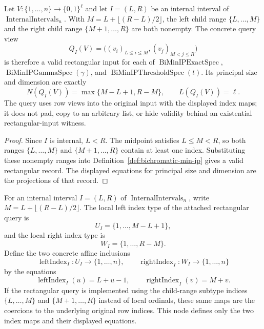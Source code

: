 \begin{lemma}
  \label{lem:minip-split-query-view-valid}
  Let $V:\{1,\ldots,n\}\to\{0,1\}^{\ell}$ and let
  $I=(L,R)$ be an internal interval of
  $\operatorname{InternalIntervals}_n$.  With
  $M=L+\lfloor(R-L)/2\rfloor$, the left child range
  $\{L,\ldots,M\}$ and the right child range $\{M+1,\ldots,R\}$ are both
  nonempty.  The concrete query view
  \[
    Q_I(V)=
      \bigl((v_i)_{L\leq i\leq M},(v_j)_{M<j\leq R}\bigr)
  \]
  is therefore a valid rectangular input for each of
  $\operatorname{BiMinIPExactSpec}$,
  $\operatorname{BiMinIPGammaSpec}(\gamma)$, and
  $\operatorname{BiMinIPThresholdSpec}(t)$.  Its principal size and dimension
  are exactly
  \[
    N(Q_I(V))=\max\{M-L+1,R-M\},\qquad L(Q_I(V))=\ell.
  \]
  The query uses row views into the original input with the displayed index
  maps; it does not pad, copy to an arbitrary list, or hide validity behind an
  existential rectangular-input witness.
\end{lemma}
\begin{proof}
  Since $I$ is internal, $L<R$.  The midpoint satisfies $L\leq M<R$, so both
  ranges $\{L,\ldots,M\}$ and $\{M+1,\ldots,R\}$ contain at least one index.
  Substituting these nonempty ranges into
  Definition~\ref{def:bichromatic-min-ip} gives a valid rectangular record.
  The displayed equations for principal size and dimension are the projections
  of that record.
\end{proof}

\begin{definition}
  \label{def:minip-split-answer-affine-index-maps}
  For an internal interval $I=(L,R)$ of
  $\operatorname{InternalIntervals}_n$, write
  $M=L+\lfloor(R-L)/2\rfloor$.  The local left index type of the attached
  rectangular query is
  \[
    U_I=\{1,\ldots,M-L+1\},
  \]
  and the local right index type is
  \[
    W_I=\{1,\ldots,R-M\}.
  \]
  Define the two concrete affine inclusions
  \[
    \operatorname{leftIndex}_I:U_I\to\{1,\ldots,n\},
    \qquad
    \operatorname{rightIndex}_I:W_I\to\{1,\ldots,n\}
  \]
  by the equations
  \[
    \operatorname{leftIndex}_I(u)=L+u-1,
    \qquad
    \operatorname{rightIndex}_I(v)=M+v.
  \]
  If the rectangular query is implemented using the child-range subtype
  indices $\{L,\ldots,M\}$ and $\{M+1,\ldots,R\}$ instead of local ordinals,
  these same maps are the coercions to the underlying original row indices.
  This node defines only the two index maps and their displayed equations.
\end{definition}

